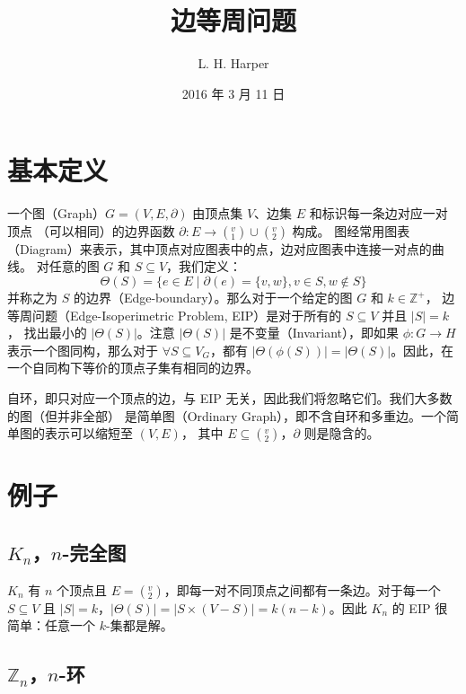 \documentclass[12pt, a4paper]{article}
\author{L. H. Harper}
\date{2016 年 3 月 11 日}
\begin{document}
\title{边等周问题}
\maketitle

\section{基本定义}
\label{Section 1}

一个图（Graph）$G = (V, E, \partial)$ 由顶点集 $V$、边集 $E$ 和标识每一条边对应一对顶点
（可以相同）的边界函数 $\partial \colon E \rightarrow (_1^v) \cup (_2^v)$ 构成。
图经常用图表（Diagram）来表示，其中顶点对应图表中的点，边对应图表中连接一对点的曲线。
对任意的图 $G$ 和 $S \subseteq V$，我们定义：
\begin{equation*}
\Theta(S) = \{e \in E \mid \partial(e) = \{v, w\}, v \in S, w \notin S\}
\end{equation*}
并称之为 $S$ 的边界（Edge-boundary）。那么对于一个给定的图 $G$ 和 $k \in \mathbb{Z}^+$，
边等周问题（Edge-Isoperimetric Problem, EIP）是对于所有的 $S \subseteq V$ 并且 $|S| = k$，
找出最小的 $|\Theta(S)|$。注意 $|\Theta(S)|$ 是不变量（Invariant），即如果
$\phi \colon G \rightarrow H$ 表示一个图同构，那么对于 $\forall S \subseteq V_G$，都有
$|\Theta(\phi(S))| = |\Theta(S)|$。因此，在一个自同构下等价的顶点子集有相同的边界。

自环，即只对应一个顶点的边，与 EIP 无关，因此我们将忽略它们。我们大多数的图（但并非全部）
是简单图（Ordinary Graph），即不含自环和多重边。一个简单图的表示可以缩短至 $(V, E)$，
其中 $E \subseteq (_2^v)$，$\partial$ 则是隐含的。

\section{例子}
\label{Section 2}

\subsection{$K_n$，$n$-完全图}
\label{Subsection 2.1}

$K_n$ 有 $n$ 个顶点且 $E = (_2^v)$，即每一对不同顶点之间都有一条边。对于每一个 $S \subseteq V$
且 $|S| = k$，$|\Theta(S)| = |S \times (V − S)| = k(n − k)$。因此 $K_n$ 的 EIP
很简单：任意一个 $k$-集都是解。

\subsection{$\mathbb{Z}_n$，$n$-环}
\label{Subsection 2.2}
\end{document}
